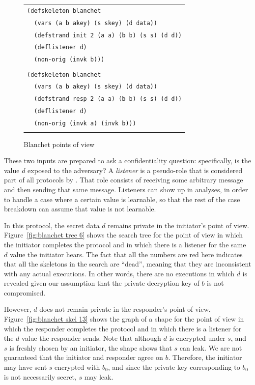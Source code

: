 \begin{figure}
\centering
\begin{tabular}{l}
\verb|(defskeleton blanchet|\\
\verb|  (vars (a b akey) (s skey) (d data))|\\
\verb|  (defstrand init 2 (a a) (b b) (s s) (d d))|\\
\verb|  (deflistener d)|\\
\verb|  (non-orig (invk b)))|\\\\
\verb|(defskeleton blanchet|\\
\verb|  (vars (a b akey) (s skey) (d data))|\\
\verb|  (defstrand resp 2 (a a) (b b) (s s) (d d))|\\
\verb|  (deflistener d)|\\
\verb|  (non-orig (invk a) (invk b)))|\\\\
\end{tabular}
\caption{Blanchet points of view}
\label{fig:blanchet pov3-4}
\end{figure}

 These two inputs are prepared to
ask a confidentiality question: specifically, is the value $d$ exposed
to the adversary?  A \emph{listener} is a pseudo-role that is
considered part of all protocols by {\cpsa}.  That role consists of
receiving some arbitrary message and then sending that same message.
Listeners can show up in {\cpsa} analyses, in order to handle a case
where a certain value is learnable, so that the rest of the case
breakdown can assume that value is not learnable.

In this protocol, the secret data $d$ remains private in the
initiator's point of view.  Figure~\ref{fig:blanchet tree 6} shows the
search tree for the point of view in which the initiator completes the
protocol and in which there is a listener for the same $d$ value the
initiator hears.  The fact that all the numbers are red here indicates
that all the skeletons in the search are ``dead'', meaning that they are
inconsistent with any actual executions.  In other words, there are no
executions in which $d$ is revealed given our assumption that the private
decryption key of $b$ is not compromised.

However, $d$ does not remain private in the responder's point of view.
Figure~\ref{fig:blanchet skel 13} shows the graph of a shape for the
point of view in which the responder completes the protocol and in
which there is a listener for the $d$ value the responder sends.  Note
that although $d$ is encrypted under $s$, and $s$ is freshly chosen by
an initiator, the shape shows that $s$ can leak.  We are not
guaranteed that the initiator and responder agree on $b$.  Therefore,
the initiator may have sent $s$ encrypted with $b_0$, and since the
private key corresponding to $b_0$ is not necessarily secret, $s$ may
leak.


